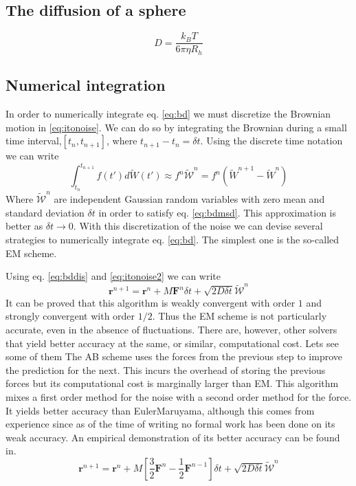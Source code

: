 \documentclass[ twoside,openright,titlepage,numbers=noenddot,%
headinclude,footinclude,cleardoublepage=empty,abstract=on,
BCOR=5mm,paper=a4,fontsize=11pt, dvipsnames
]{scrreprt}
\renewcommand{\vec}[1]{\bm{#1}}
\newcommand{\dt}{\delta t}
\newcommand{\kT}{k_B T}
\newcommand{\half}{\frac{1}{2}}
\newcommand{\noise}{\widetilde{W}}
\begin{document}
\subsection{The diffusion of a sphere}
\begin{equation}
  D = \frac{\kT}{6\pi\eta R_h}
\end{equation}
\subsection{Numerical integration}
In order to numerically integrate eq. \eqref{eq:bd} we must discretize the Brownian motion in \eqref{eq:itonoise}. We can do so by integrating the Brownian during a small time interval,$[t_n, t_{n+1}]$, where $t_{n+1}-t_{n} = \dt$. Using the discrete time notation we can write
\begin{equation}
  \label{eq:itonoise2}
  \int_{t_n}^{t_{n+1}}f(t')d\noise(t') \approx f^n \mathcal{\noise}^n = f^n \left(\noise^{n+1} - \noise^n\right)
\end{equation}
Where $\mathcal{\noise}^n$ are independent Gaussian random variables with zero mean and standard deviation $\dt$ in order to satisfy eq. \eqref{eq:bdmsd}. This approximation is better as $\dt \rightarrow 0$.
With this discretization of the noise we can devise several strategies to numerically integrate eq. \eqref{eq:bd}. The simplest one is the so-called \gls{EM} scheme\cite{Desmond2001}.

Using eq. \eqref{eq:bddis} and \eqref{eq:itonoise2} we can write
\begin{equation}
  \vec{r}^{n+1} = \vec{r}^n + M\vec{F}^n\dt + \sqrt{2D\dt}\vec{\mathcal{\noise}}^n
\end{equation}
It can be proved that this algorithm is weakly convergent with order $1$ and strongly convergent with order $1/2$\cite{Kloeden2011}. Thus the \gls{EM} scheme is not particularly accurate, even in the absence of fluctuations.
There are, however, other solvers that yield better accuracy at the same, or similar, computational cost. Lets see some of them
The \gls{AB} scheme uses the forces from the previous step to improve the prediction for the next. This incurs the overhead of storing the previous forces but its computational cost is marginally larger than \gls{EM}. This algorithm mixes a first order method for the noise with a second order method for the force. It yields better accuracy than EulerMaruyama, although this comes from experience since as of the time of writing no formal work has been done on its weak accuracy. An empirical demonstration of its better accuracy can be found in\cite{Balboa2017}.
\begin{equation}
  \vec{r}^{n+1} = \vec{r}^n + M\left[\frac{3}{2}\vec{F}^n - \half \vec{F}^{n-1}\right]\dt + \sqrt{2D\dt}\vec{\mathcal{\noise}}^n
\end{equation}
\end{document}

